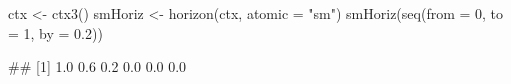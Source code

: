 \begin{Schunk}
% --begin: "horizon"
\begin{Sinput}
ctx <- ctx3()
smHoriz <- horizon(ctx, atomic = "sm")
smHoriz(seq(from = 0, to = 1, by = 0.2))
\end{Sinput}
\begin{Soutput}
## [1] 1.0 0.6 0.2 0.0 0.0 0.0
\end{Soutput}
%
% --end: "horizon"
\end{Schunk}
